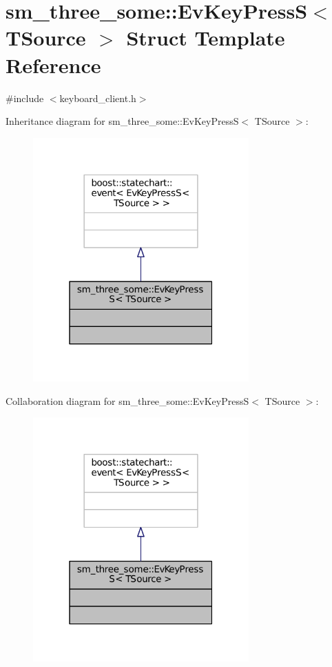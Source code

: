 \hypertarget{structsm__three__some_1_1EvKeyPressS}{}\section{sm\+\_\+three\+\_\+some\+:\+:Ev\+Key\+PressS$<$ T\+Source $>$ Struct Template Reference}
\label{structsm__three__some_1_1EvKeyPressS}


{\ttfamily \#include $<$keyboard\+\_\+client.\+h$>$}



Inheritance diagram for sm\+\_\+three\+\_\+some\+:\+:Ev\+Key\+PressS$<$ T\+Source $>$\+:
\nopagebreak
\begin{figure}[H]
\begin{center}
\leavevmode
\includegraphics[width=235pt]{structsm__three__some_1_1EvKeyPressS__inherit__graph}
\end{center}
\end{figure}


Collaboration diagram for sm\+\_\+three\+\_\+some\+:\+:Ev\+Key\+PressS$<$ T\+Source $>$\+:
\nopagebreak
\begin{figure}[H]
\begin{center}
\leavevmode
\includegraphics[width=235pt]{structsm__three__some_1_1EvKeyPressS__coll__graph}
\end{center}
\end{figure}


